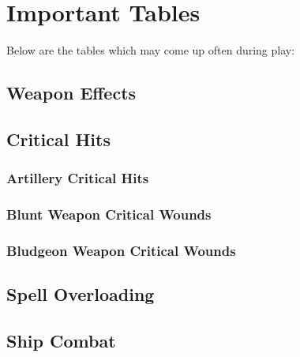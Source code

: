 \chapter{Important Tables}
\label{ap:important-tables}
Below are the tables which may come up often during play:
\section{Weapon Effects}


\section{Critical Hits}
\label{critical-hits}

\subsection{Artillery Critical Hits}
\label{critical-hits-artillery}

\subsection{Blunt Weapon Critical Wounds}
\label{critical-hits-blunt}
\begin{normbox}\end{normbox}

\subsection{Bludgeon Weapon Critical Wounds}
\label{critical-hits-bludgeon}
\begin{normbox}\end{normbox}

\section{Spell Overloading}


\section{Ship Combat}
\begin{multicols}{2}
\begin{normbox}

\end{normbox}
\begin{normbox}

\end{normbox}
\end{multicols}